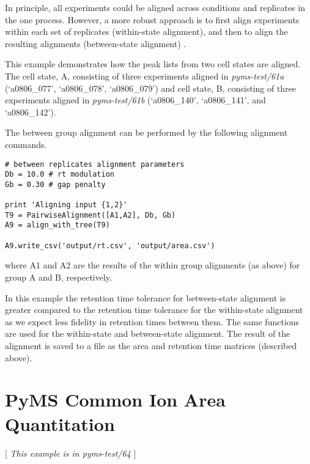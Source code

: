 In principle, all experiments could be aligned across conditions and
replicates in the one process. However, a more robust approach is to first align
experiments within each set of replicates (within-state
alignment), and then to align the resulting alignments (between-state
alignment) \cite{Robinson07}.

This example demonstrates how the peak lists from two cell states are
aligned. The cell state, A, consisting of three experiments aligned in {\em
pyms-test/61a} (`a0806\_077', `a0806\_078', `a0806\_079') and cell state,
B, consisting of three experiments aligned in {\em pyms-test/61b} (`a0806\_140',
`a0806\_141', and `a0806\_142').

The between group alignment can be performed by the following alignment
commands.

\begin{verbatim}
# between replicates alignment parameters
Db = 10.0 # rt modulation
Gb = 0.30 # gap penalty

print 'Aligning input {1,2}'
T9 = PairwiseAlignment([A1,A2], Db, Gb)
A9 = align_with_tree(T9)

A9.write_csv('output/rt.csv', 'output/area.csv')
\end{verbatim}

\noindent
where A1 and A2 are the results of the within group alignments (as above) for
group A and B, respectively.

In this example the retention time tolerance for between-state alignment is
greater compared to the retention time tolerance for the within-state alignment
as we expect less fidelity in retention times between them.  The same functions
are used for the within-state and between-state alignment. The result of the
alignment is saved to a file as the area and retention time matrices (described
above).

%

\section{PyMS Common Ion Area Quantitation}
[ {\em This example is in pyms-test/64 } ]
\label{sec:common-ion}

